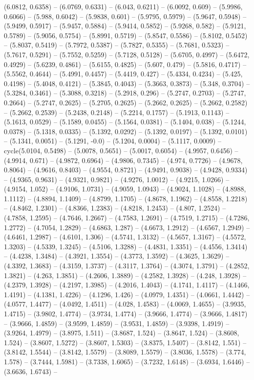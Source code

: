 (6.0812, 0.6358) -- (6.0769, 0.6331) -- (6.043, 0.6211) -- (6.0092, 0.609) -- (5.9986, 0.6066) -- (5.988, 0.6042) -- (5.9838, 0.601) -- (5.9795, 0.5979) -- (5.9647, 0.5948) -- (5.9499, 0.5917) -- (5.9457, 0.5884) -- (5.9414, 0.5852) -- (5.9268, 0.582) -- (5.9121, 0.5789) -- (5.9056, 0.5754) -- (5.8991, 0.5719) -- (5.8547, 0.5586) -- (5.8102, 0.5452) -- (5.8037, 0.5419) -- (5.7972, 0.5387) -- (5.7827, 0.5355) -- (5.7681, 0.5323) -- (5.7617, 0.5291) -- (5.7552, 0.5259) -- (5.7128, 0.5128) -- (5.6705, 0.4997) -- (5.6472, 0.4929) -- (5.6239, 0.4861) -- (5.6155, 0.4825) -- (5.607, 0.479) -- (5.5816, 0.4717) -- (5.5562, 0.4644) -- (5.4991, 0.4457) -- (5.4419, 0.427) -- (5.4334, 0.4234) -- (5.425, 0.4198) -- (5.4048, 0.4121) -- (5.3845, 0.4043) -- (5.3663, 0.3873) -- (5.348, 0.3704) -- (5.3284, 0.3461) -- (5.3088, 0.3218) -- (5.2918, 0.296) -- (5.2747, 0.2703) -- (5.2747, 0.2664) -- (5.2747, 0.2625) -- (5.2705, 0.2625) -- (5.2662, 0.2625) -- (5.2662, 0.2582) -- (5.2662, 0.2539) -- (5.2438, 0.2148) -- (5.2214, 0.1757) -- (5.1913, 0.1143) -- (5.1613, 0.0529) -- (5.1589, 0.0455) -- (5.1564, 0.0381) -- (5.1404, 0.038) -- (5.1244, 0.0378) -- (5.1318, 0.0335) -- (5.1392, 0.0292) -- (5.1392, 0.0197) -- (5.1392, 0.0101) -- (5.1341, 0.0051) -- (5.1291, -0.0) -- (5.1204, 0.0004) -- (5.1117, 0.0009) -- cycle(5.0104, 0.5498) -- (5.0078, 0.5651) -- (5.0017, 0.6054) -- (4.9957, 0.6456) -- (4.9914, 0.671) -- (4.9872, 0.6964) -- (4.9806, 0.7345) -- (4.974, 0.7726) -- (4.9678, 0.8064) -- (4.9616, 0.8403) -- (4.9554, 0.8721) -- (4.9491, 0.9038) -- (4.9428, 0.9334) -- (4.9365, 0.9631) -- (4.9321, 0.9821) -- (4.9276, 1.0012) -- (4.9215, 1.0266) -- (4.9154, 1.052) -- (4.9106, 1.0731) -- (4.9059, 1.0943) -- (4.9024, 1.1028) -- (4.8988, 1.1112) -- (4.8894, 1.1409) -- (4.8799, 1.1705) -- (4.8678, 1.1962) -- (4.8558, 1.2218) -- (4.8462, 1.2301) -- (4.8366, 1.2383) -- (4.8218, 1.2453) -- (4.807, 1.2524) -- (4.7858, 1.2595) -- (4.7646, 1.2667) -- (4.7583, 1.2691) -- (4.7519, 1.2715) -- (4.7286, 1.2772) -- (4.7054, 1.2829) -- (4.6863, 1.287) -- (4.6673, 1.2912) -- (4.6567, 1.2949) -- (4.6461, 1.2987) -- (4.6101, 1.306) -- (4.5741, 1.3132) -- (4.5657, 1.3167) -- (4.5572, 1.3203) -- (4.5339, 1.3245) -- (4.5106, 1.3288) -- (4.4831, 1.3351) -- (4.4556, 1.3414) -- (4.4238, 1.3484) -- (4.3921, 1.3554) -- (4.3773, 1.3592) -- (4.3625, 1.3629) -- (4.3392, 1.3683) -- (4.3159, 1.3737) -- (4.3117, 1.3764) -- (4.3074, 1.3791) -- (4.2852, 1.3821) -- (4.263, 1.3851) -- (4.2606, 1.3889) -- (4.2582, 1.3928) -- (4.248, 1.3928) -- (4.2379, 1.3928) -- (4.2197, 1.3985) -- (4.2016, 1.4043) -- (4.1741, 1.4117) -- (4.1466, 1.4191) -- (4.1381, 1.4226) -- (4.1296, 1.426) -- (4.0979, 1.4351) -- (4.0661, 1.4442) -- (4.0577, 1.4477) -- (4.0492, 1.4511) -- (4.028, 1.4583) -- (4.0069, 1.4655) -- (3.9935, 1.4715) -- (3.9802, 1.4774) -- (3.9734, 1.4774) -- (3.9666, 1.4774) -- (3.9666, 1.4817) -- (3.9666, 1.4859) -- (3.9599, 1.4859) -- (3.9531, 1.4859) -- (3.9398, 1.4919) -- (3.9264, 1.4979) -- (3.8975, 1.511) -- (3.8687, 1.524) -- (3.8647, 1.524) -- (3.8608, 1.524) -- (3.8607, 1.5272) -- (3.8607, 1.5303) -- (3.8375, 1.5407) -- (3.8142, 1.551) -- (3.8142, 1.5544) -- (3.8142, 1.5579) -- (3.8089, 1.5579) -- (3.8036, 1.5578) -- (3.774, 1.578) -- (3.7444, 1.5981) -- (3.7338, 1.6065) -- (3.7232, 1.6148) -- (3.6934, 1.6446) -- (3.6636, 1.6743) -- 